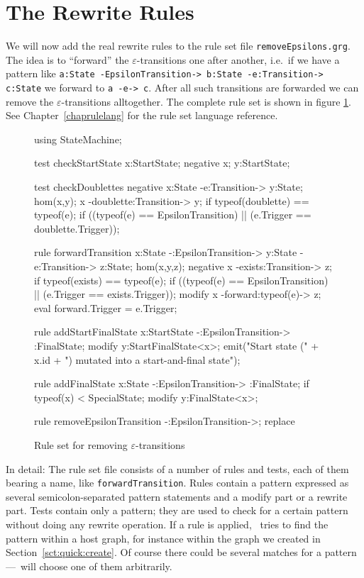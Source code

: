\section{The Rewrite Rules}
We will now add the real rewrite rules to the rule set file \texttt{removeEpsilons.grg}.
The idea is to ``forward'' the $\varepsilon$-transitions one after another, i.e.\ if we have a pattern like \texttt{a:State -EpsilonTransition-> b:State -e:Transition-> c:State} we forward to \texttt{a -e-> c}.
After all such transitions are forwarded we can remove the $\varepsilon$-transitions alltogether.
The complete rule set is shown in figure \ref{fig:quick:ruleset}.
See Chapter~\ref{chaprulelang} for the rule set language reference.
\begin{figure}[htbp]
	\centering
	\begin{grgen}
using StateMachine;

test checkStartState {
    x:StartState;
    negative {
        x;
        y:StartState;
    }
}

test checkDoublettes {
    negative {
        x:State -e:Transition-> y:State;
        hom(x,y);
        x -doublette:Transition-> y;
        if {typeof(doublette) == typeof(e);}
        if { ((typeof(e) == EpsilonTransition) || (e.Trigger == doublette.Trigger)); }
    }
}

rule forwardTransition {
    x:State -:EpsilonTransition-> y:State -e:Transition-> z:State;
    hom(x,y,z);
    negative {
        x -exists:Transition-> z;
        if {typeof(exists) == typeof(e);}
        if { ((typeof(e) == EpsilonTransition) || (e.Trigger == exists.Trigger)); }
    }
    modify {
        x -forward:typeof(e)-> z;
        eval {forward.Trigger = e.Trigger;}
    }    
}

rule addStartFinalState {
    x:StartState -:EpsilonTransition-> :FinalState;
    modify {
        y:StartFinalState<x>;
        emit("Start state (" + x.id +  ") mutated into a start-and-final state");
    }
}

rule addFinalState {
    x:State -:EpsilonTransition-> :FinalState;
    if {typeof(x) < SpecialState;}
    modify {
        y:FinalState<x>;
    }
}

rule removeEpsilonTransition {
    -:EpsilonTransition->;
    replace {}   
}	
	\end{grgen}
	\caption{Rule set for removing $\varepsilon$-transitions}
	\label{fig:quick:ruleset}
\end{figure}

In detail: The rule set file consists of a number of rules and tests, each of them bearing a name, like \texttt{forwardTransition}.
Rules contain a pattern expressed as several semicolon-separated pattern statements and a modify part or a rewrite part.
Tests contain only a pattern; they are used to check for a certain pattern without doing any rewrite operation.
If a rule is applied, \GrG\ tries to find the pattern within a host graph, for instance within the graph we created in Section~\ref{sct:quick:create}.
Of course there could be several matches for a pattern---\GrG\ will choose one of them arbitrarily.

